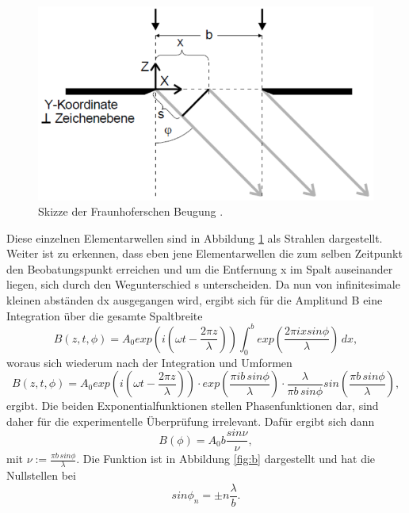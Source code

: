 \begin{figure}[H]
    \centering
    \includegraphics{Spalt.png}
    \caption{Skizze der Fraunhoferschen Beugung \cite{V406}.}
    \label{fig:a}
\end{figure}
Diese einzelnen Elementarwellen sind in Abbildung \ref{fig:a} als Strahlen dargestellt. Weiter ist zu erkennen, dass eben jene 
Elementarwellen die zum selben Zeitpunkt den Beobatungspunkt erreichen und um die Entfernung x im Spalt auseinander liegen, 
sich durch den Wegunterschied s unterscheiden. Da nun von infinitesimale kleinen abständen dx ausgegangen wird, ergibt sich 
für die Amplitund B eine Integration über die gesamte Spaltbreite
\begin{equation}
    \label{eq:2}
    B(z,t,\phi) = A_0 exp\left( i \left( \omega t - \frac{2 \pi z }{\lambda}\right)\right) \int_{0}^{b} exp\left(\frac{2 \pi i x sin \phi}{\lambda}\right) \,dx ,
\end{equation}
woraus sich wiederum nach der Integration und Umformen
\begin{equation}
    \label{eq:3}
    B(z,t,\phi) = A_0 exp\left(i \left(\omega t - \frac{2 \pi z}{\lambda}\right)\right) \cdot exp\left(\frac{\pi i b \, sin \phi}{\lambda}\right) \cdot \frac{\lambda}{\pi b \, sin \phi} sin\left(\frac{\pi b \, sin \phi}{\lambda}\right),
\end{equation}
ergibt.
Die beiden Exponentialfunktionen stellen Phasenfunktionen dar, sind daher für die experimentelle Überprüfung irrelevant.
Dafür ergibt sich dann 
\begin{equation}
    \label{eq:4}
    B(\phi) = A_0 b \frac{sin \nu}{\nu},
\end{equation}
mit $\nu := \frac{\pi b \, sin \phi}{\lambda}$.
Die Funktion ist in Abbildung \ref{fig:b} dargestellt und hat die Nullstellen bei 
\begin{equation}
    \label{eq:5}
    sin \phi_n = \pm n\frac{\lambda}{b}.
\end{equation}
